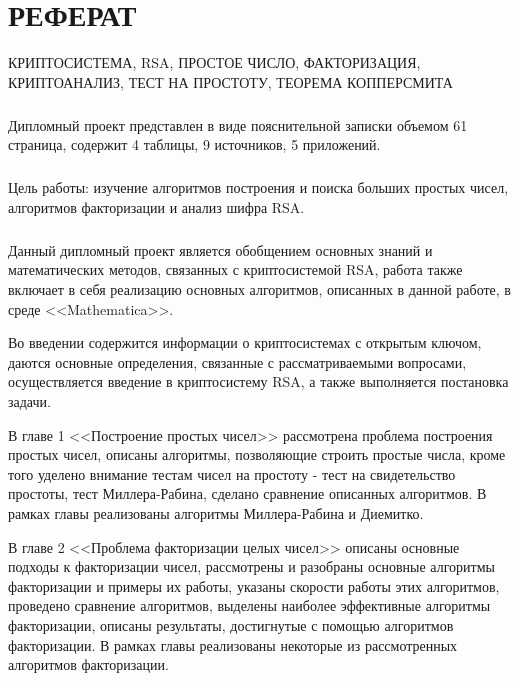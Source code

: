 
\newpage
\chapter*{РЕФЕРАТ}

КРИПТОСИСТЕМА, RSA, ПРОСТОЕ ЧИСЛО, ФАКТОРИЗАЦИЯ, КРИПТОАНАЛИЗ, ТЕСТ НА ПРОСТОТУ, ТЕОРЕМА КОППЕРСМИТА

\paragraph{} Дипломный проект представлен в виде пояснительной записки объемом 61 страница, содержит 4 таблицы, 9 источников, 5 приложений.

\paragraph{} Цель работы: изучение алгоритмов построения и поиска больших простых чисел, алгоритмов факторизации и анализ шифра RSA.

\paragraph{} Данный дипломный проект является обобщением основных знаний и математических методов, связанных с криптосистемой RSA, работа также
	включает в себя реализацию основных алгоритмов, описанных в данной работе, в среде <<Mathematica>>.	

	Во введении содержится информации о криптосистемах с открытым ключом, даются основные определения, связанные с рассматриваемыми вопросами,
	осуществляется введение в криптосистему RSA, а также выполняется постановка задачи.

	В главе 1 <<Построение простых чисел>> рассмотрена проблема построения простых чисел, описаны алгоритмы, позволяющие строить простые числа, 
	кроме того уделено внимание тестам чисел на простоту - тест на свидетельство простоты, тест Миллера-Рабина, сделано сравнение описанных алгоритмов. В рамках 
	главы реализованы алгоритмы Миллера-Рабина и Диемитко.

	В главе 2 <<Проблема факторизации целых чисел>> описаны основные подходы к факторизации чисел, рассмотрены и разобраны основные алгоритмы факторизации и примеры их работы, указаны скорости работы этих алгоритмов, проведено сравнение алгоритмов, выделены наиболее эффективные алгоритмы факторизации, описаны результаты, достигнутые с помощью алгоритмов факторизации. В рамках главы реализованы некоторые из рассмотренных алгоритмов факторизации.

